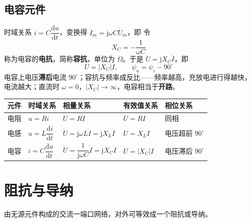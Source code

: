 \subsection{电容元件}
时域关系 $i=C\dfrac{\mathrm{d}u}{\mathrm{d}t}$，变换得 $\dot{I}_m=\mathrm{j}\omega C\dot{U}_m$，即
令
\begin{equation}
X_C=-\frac{1}{\omega C}
\end{equation}
称为电容的\textbf{电抗}，简称\textbf{容抗}，单位为 $\Omega$。于是 $\dot{U}=\mathrm{j}X_C\dot{I}$，即
\begin{equation}
U=|X_C|I,\qquad \psi_u=\psi_i-90^\circ
\end{equation}
电容上电压\textbf{滞后}电流 $90^\circ$；容抗与频率成反比——频率越高，充放电进行得越快，电流越大；直流时 $\omega=0$，$|X_C|\to\infty$，电容相当于\textbf{开路}。

\begin{center}
\begin{tabular}{@{}lllll@{}}
\toprule
元件 & 时域关系 & 相量关系 & 有效值关系 & 相位关系 \\
\midrule
电阻 & $u=Ri$ & $\dot{U}=R\dot{I}$ & $U=RI$ & 同相 \\
电感 & $u=L\dfrac{\mathrm{d}i}{\mathrm{d}t}$ & $\dot{U}=\mathrm{j}\omega L\dot{I}=\mathrm{j}X_L\dot{I}$ & $U=X_LI$ & 电压超前 $90^\circ$ \\
电容 & $i=C\dfrac{\mathrm{d}u}{\mathrm{d}t}$ & $\dot{U}=\dfrac{1}{\mathrm{j}\omega C}\dot{I}=\mathrm{j}X_C\dot{I}$ & $U=|X_C|I$ & 电压滞后 $90^\circ$ \\
\bottomrule
\end{tabular}
\end{center}


\section{阻抗与导纳}
由无源元件构成的交流一端口网络，对外可等效成一个阻抗或导纳。

